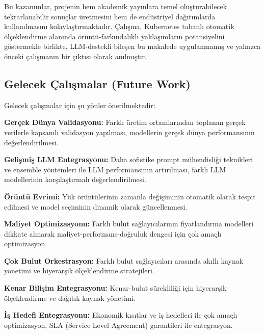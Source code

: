 Bu kazanımlar, projenin hem akademik yayınlara temel oluşturabilecek tekrarlanabilir sonuçlar üretmesini hem de endüstriyel dağıtımlarda kullanılmasını kolaylaştırmaktadır. Çalışma, Kubernetes tabanlı otomatik ölçeklendirme alanında örüntü-farkındalıklı yaklaşımların potansiyelini göstermekle birlikte, LLM-destekli bileşen bu makalede uygulanmamış ve yalnızca önceki çalışmanın bir çıktısı olarak anılmıştır.

\subsection{Gelecek Çalışmalar (Future Work)}

Gelecek çalışmalar için şu yönler önerilmektedir:

\textbf{Gerçek Dünya Validasyonu:} Farklı üretim ortamlarından toplanan gerçek verilerle kapsamlı validasyon yapılması, modellerin gerçek dünya performansının değerlendirilmesi.

\textbf{Gelişmiş LLM Entegrasyonu:} Daha sofistike prompt mühendisliği teknikleri ve ensemble yöntemleri ile LLM performansının artırılması, farklı LLM modellerinin karşılaştırmalı değerlendirilmesi.

\textbf{Örüntü Evrimi:} Yük örüntülerinin zamanla değişiminin otomatik olarak tespit edilmesi ve model seçiminin dinamik olarak güncellenmesi.

\textbf{Maliyet Optimizasyonu:} Farklı bulut sağlayıcılarının fiyatlandırma modelleri dikkate alınarak maliyet-performans-doğruluk dengesi için çok amaçlı optimizasyon.

\textbf{Çok Bulut Orkestrasyon:} Farklı bulut sağlayıcıları arasında akıllı kaynak yönetimi ve hiyerarşik ölçeklendirme stratejileri.

\textbf{Kenar Bilişim Entegrasyonu:} Kenar-bulut sürekliliği için hiyerarşik ölçeklendirme ve dağıtık kaynak yönetimi.

\textbf{İş Hedefi Entegrasyonu:} Ekonomik kısıtlar ve iş hedefleri ile çok amaçlı optimizasyon, SLA (Service Level Agreement) garantileri ile entegrasyon.
